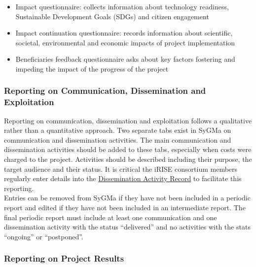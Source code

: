 \documentclass[
]{article}
\providecommand{\tightlist}{%
  \setlength{\itemsep}{0pt}\setlength{\parskip}{0pt}}
\begin{document}
\begin{itemize}
\tightlist
\item
  Impact questionnaire: collects information about technology readiness, Sustainable Development Goals (SDGs) and citizen engagement
\item
  Impact continuation questionnaire: records information about scientific, societal, environmental and economic impacts of project implementation
\item
  Beneficiaries feedback questionnaire asks about key factors fostering and impeding the impact of the progress of the project
\end{itemize}

\hypertarget{reporting-on-communication-dissemination-and-exploitation}{%
\subsubsection{Reporting on Communication, Dissemination and Exploitation}\label{reporting-on-communication-dissemination-and-exploitation}}

Reporting on communication, dissemination and exploitation follows a qualitative rather than a quantitative approach. Two separate tabs exist in SyGMa on communication and dissemination activities. The main communication and dissemination activities should be added to these tabs, especially when costs were charged to the project. Activities should be described including their purpose, the target audience and their status. It is critical the iRISE consortium members regularly enter details into the \href{https://charitede.sharepoint.com/:x:/r/sites/iRISE/Shared\%20Documents/WP6/iRISE\%20Dissemination\%20Activity\%20Record.xlsx?d=w47a1cbfaa6c34ab5aee84a6dba643912\&csf=1\&web=1\&e=9cfBaW}{Dissemination Activity Record} to facilitate this reporting.\\
Entries can be removed from SyGMa if they have not been included in a periodic report and edited if they have not been included in an intermediate report. The final periodic report must include at least one communication and one dissemination activity with the status ``delivered'' and no activities with the stats ``ongoing'' or ``postponed''.

\hypertarget{reporting-on-project-results}{%
\subsubsection{Reporting on Project Results}\label{reporting-on-project-results}}
\end{document}
